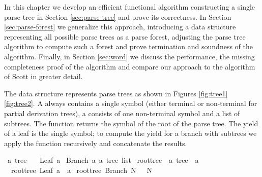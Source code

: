 \begin{isabellebody}
\begin{isamarkuptext}
In this chapter we develop an efficient functional algorithm constructing a single parse
tree in Section \ref{sec:parse-tree} and prove its correctness. In Section \ref{sec:parse-forest}
we generalize this approach, introducing a data structure representing all possible parse trees
as a parse forest, adjusting the parse tree algorithm to compute such a forest and prove termination
and soundness of the algorithm. Finally, in Section \ref{sec:word} we discuss the performance, the missing
completeness proof of the algorithm and compare our approach to the algorithm of Scott in greater detail.%
\end{isamarkuptext}\isamarkuptrue%
%
\isadelimdocument
%
\endisadelimdocument
%
\isatagdocument
%
\isamarkuptrue%
%
\endisatagdocument
{\isafolddocument}%
%
\isadelimdocument
%
\endisadelimdocument
%
\begin{isamarkuptext}%
The data structure  represents parse trees as shown in Figures \ref{fig:tree1} \ref{fig:tree2}.
A  always contains a single symbol (either terminal or non-terminal for partial derivation trees), a  consists of one non-terminal
symbol and a list of subtrees. The function  returns the symbol of the root of the
parse tree. The yield of a leaf is the single symbol; to compute the yield for a branch with
subtrees  we apply the function  recursively and concatenate the results.%
\end{isamarkuptext}\isamarkuptrue%
\isamarkupfalse%
\ {\isacharprime}{\kern0pt}a\ tree\ {\isacharequal}{\kern0pt}\isanewline
\ \ Leaf\ {\isacharprime}{\kern0pt}a\isanewline
{\isacharbar}{\kern0pt}\ Branch\ {\isacharprime}{\kern0pt}a\ {\isachardoublequoteopen}{\isacharprime}{\kern0pt}a\ tree\ list{\isachardoublequoteclose}\isanewline
\isanewline
{}\isamarkupfalse%
\ root{\isacharunderscore}{\kern0pt}tree\ {\isacharcolon}{\kern0pt}{\isacharcolon}{\kern0pt}\ {\isachardoublequoteopen}{\isacharprime}{\kern0pt}a\ tree\ {\isasymRightarrow}\ {\isacharprime}{\kern0pt}a{\isachardoublequoteclose}\ \isanewline
\ \ {\isachardoublequoteopen}root{\isacharunderscore}{\kern0pt}tree\ {\isacharparenleft}{\kern0pt}Leaf\ a{\isacharparenright}{\kern0pt}\ {\isacharequal}{\kern0pt}\ a{\isachardoublequoteclose}\isanewline
{\isacharbar}{\kern0pt}\ {\isachardoublequoteopen}root{\isacharunderscore}{\kern0pt}tree\ {\isacharparenleft}{\kern0pt}Branch\ N\ {\isacharunderscore}{\kern0pt}{\isacharparenright}{\kern0pt}\ {\isacharequal}{\kern0pt}\ N{\isachardoublequoteclose}\isanewline

\end{isabellebody}
